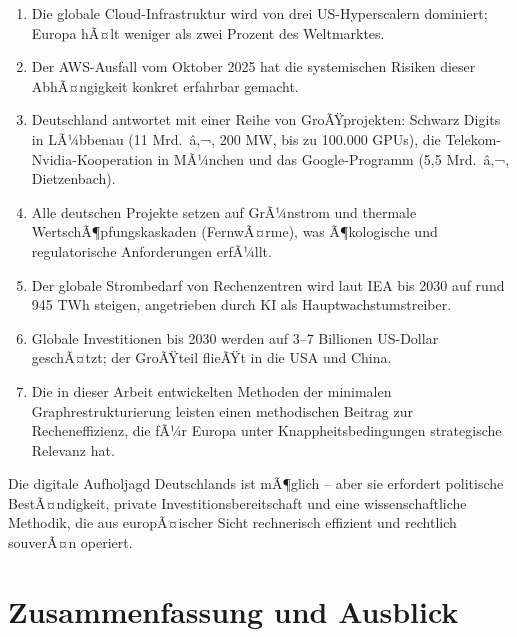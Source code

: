 ﻿\documentclass[12pt, a4paper, openany]{report}
\begin{document}
\begin{enumerate}[label=(\roman*)]
	\item Die globale Cloud-Infrastruktur wird von drei US-Hyperscalern
	dominiert; Europa hÃ¤lt weniger als zwei Prozent des Weltmarktes.
	\item Der AWS-Ausfall vom Oktober 2025 hat die systemischen Risiken
	dieser AbhÃ¤ngigkeit konkret erfahrbar gemacht.
	\item Deutschland antwortet mit einer Reihe von GroÃŸprojekten: Schwarz
	Digits in LÃ¼bbenau (11 Mrd.\ â‚¬, 200 MW, bis zu 100.000 GPUs), die
	Telekom-Nvidia-Kooperation in MÃ¼nchen und das Google-Programm
	(5,5 Mrd.\ â‚¬, Dietzenbach).
	\item Alle deutschen Projekte setzen auf GrÃ¼nstrom und thermale
	WertschÃ¶pfungskaskaden (FernwÃ¤rme), was Ã¶kologische und
	regulatorische Anforderungen erfÃ¼llt.
	\item Der globale Strombedarf von Rechenzentren wird laut IEA bis 2030
	auf rund 945 TWh steigen, angetrieben durch KI als Hauptwachstumstreiber.
	\item Globale Investitionen bis 2030 werden auf 3--7 Billionen
	US-Dollar geschÃ¤tzt; der GroÃŸteil flieÃŸt in die USA und China.
	\item Die in dieser Arbeit entwickelten Methoden der minimalen
	Graphrestrukturierung leisten einen methodischen Beitrag zur
	Recheneffizienz, die fÃ¼r Europa unter Knappheitsbedingungen
	strategische Relevanz hat.
\end{enumerate}

\noindent
Die digitale Aufholjagd Deutschlands ist mÃ¶glich -- aber sie erfordert
politische BestÃ¤ndigkeit, private Investitionsbereitschaft und eine
wissenschaftliche Methodik, die aus europÃ¤ischer Sicht rechnerisch
effizient und rechtlich souverÃ¤n operiert.

\chapter{Zusammenfassung und Ausblick}
\label{sec:conclusion}
\end{document}
